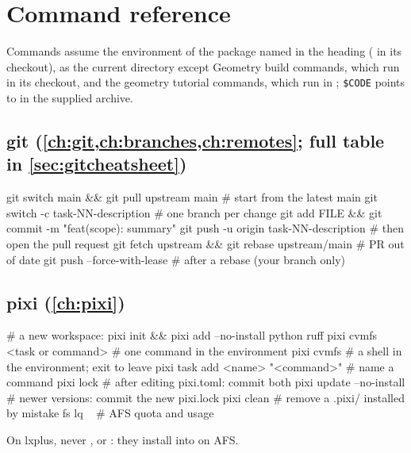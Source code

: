 \chapter{Command reference}
\label{app:cheatsheet}
\begingroup
\lstset{basicstyle=\ttfamily\footnotesize}

Commands assume the environment of the package named in the heading
( in its checkout),  as the current directory
except Geometry build commands, which run in its checkout, and the geometry
tutorial commands, which run in ;
\texttt{\$CODE} points to
 in the supplied archive.

\section*{git \hfill\normalfont\small(\cref{ch:git,ch:branches,ch:remotes}; full table in \cref{sec:gitcheatsheet})}
\begin{shell}
git switch main && git pull upstream main       # start from the latest main
git switch -c task-NN-description               # one branch per change
git add FILE && git commit -m "feat(scope): summary"
git push -u origin task-NN-description          # then open the pull request
git fetch upstream && git rebase upstream/main  # PR out of date
git push --force-with-lease                     # after a rebase (your branch only)
\end{shell}

\section*{pixi \hfill\normalfont\small(\cref{ch:pixi})}
\begin{shell}
# a new workspace:
pixi init && pixi add --no-install python ruff
pixi cvmfs <task or command>      # one command in the environment
pixi cvmfs                        # a shell in the environment; exit to leave
pixi task add <name> "<command>"  # name a command
pixi lock                         # after editing pixi.toml: commit both
pixi update --no-install          # newer versions: commit the new pixi.lock
pixi clean                        # remove a .pixi/ installed by mistake
fs lq ~                           # AFS quota and usage
\end{shell}
On lxplus, never ,  or :
they install into  on AFS.

